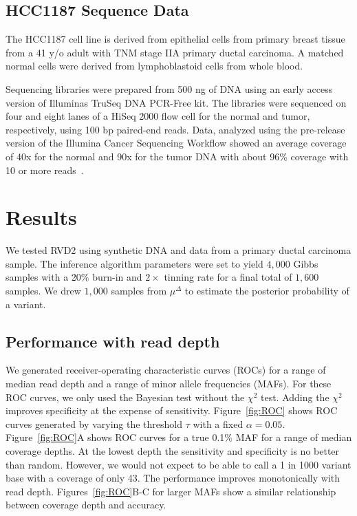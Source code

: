 \documentclass[11pt,reqno]{amsart}
\begin{document}
\subsection{HCC1187 Sequence Data}

The HCC1187 cell line is derived from  epithelial cells from primary breast tissue from a 41 y/o adult with TNM stage IIA primary ductal carcinoma. A matched normal cells were derived from lymphoblastoid cells from whole blood. 

Sequencing libraries were prepared from 500 ng of DNA using an early access version of Illuminas TruSeq DNA PCR-Free kit. The libraries were sequenced on four and eight lanes of a HiSeq 2000 flow cell for the normal and tumor, respectively, using 100 bp paired-end reads. Data, analyzed using the pre-release version of the Illumina Cancer Sequencing Workflow showed an average coverage of 40x for the normal and 90x for the tumor DNA with about 96\% coverage with 10 or more reads~\cite{}.



\section{Results}

We tested RVD2 using synthetic DNA and data from a primary ductal carcinoma sample. The inference algorithm parameters were set to yield $4,000$ Gibbs samples with a 20\% burn-in and $2\times$ tinning rate for a final total of $1,600$ samples. We drew $1,000$ samples from $\mu^{\Delta}$ to estimate the posterior probability of a variant.

\subsection{Performance with read depth}\label{sec:read_depth}

We generated receiver-operating characteristic curves (ROCs) for a range of median read depth and a range of minor allele frequencies (MAFs). For these ROC curves, we only used the Bayesian test without the $\chi^2$ test. Adding the $\chi^2$ improves specificity at the expense of sensitivity. Figure~\ref{fig:ROC} shows ROC curves generated by varying the threshold $\tau$ with a fixed $\alpha=0.05$. Figure~\ref{fig:ROC}A shows ROC curves for a true 0.1\% MAF for a range of median coverage depths. At the lowest depth the sensitivity and specificity is no better than random. However, we would not expect to be able to call a 1 in 1000 variant base with a coverage of only 43. The performance improves monotonically with read depth. Figures~\ref{fig:ROC}B-C for larger MAFs show a similar relationship between coverage depth and accuracy.
\end{document}
